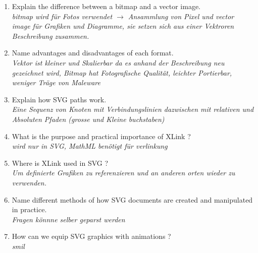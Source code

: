 \begin{enumerate}
\item Explain the difference between a bitmap and a vector image.\\
\textit{bitmap wird f\"{u}r Fotos verwendet $\rightarrow$ Ansammlung von Pixel und vector image f\"{u}r Grafiken und Diagramme, sie setzen sich aus einer Vektroren Beschreibung zusammen.}

\item Name advantages and disadvantages of each format.\\
\textit{Vektor ist kleiner und Skalierbar da es anhand der Beschreibung neu gezeichnet wird, Bitmap hat Fotografische Qualität, leichter Portierbar, weniger Träge von Maleware}

\item Explain how SVG paths work.\\
\textit{Eine Sequenz von Knoten mit Verbindungslinien dazwischen mit relativen und Absoluten Pfaden (grosse und Kleine buchstaben)}

\item What is the purpose and practical importance of XLink ?\\
\textit{wird nur in SVG, MathML ben\"{o}tigt f\"{u}r verlinkung}


\item Where is XLink used in SVG ?\\
\textit{Um definierte Grafiken zu referenzieren und an anderen orten wieder zu verwenden.}

\item Name different methods of how SVG documents are created and manipulated in practice.\\
\textit{Fragen k\"{o}nnne selber geparst werden}

\item How can we equip SVG graphics with animations ?\\
\textit{smil}
\end{enumerate}
